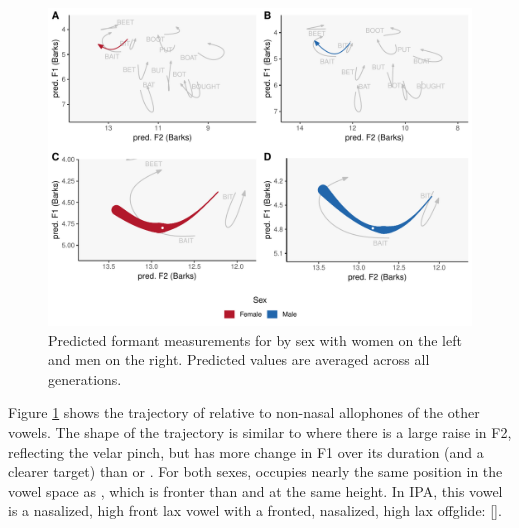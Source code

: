 \begin{figure}[tb!]
    \centering
    \includegraphics[width = 6.5in]{Figures/BING/BING_four_panel_plot_summarized.pdf}
    \caption[Predicted formant measurements for \bing by sex.]{Predicted formant measurements for \bing by sex with women on the left and men on the right. Predicted values are averaged across all generations.}
    \label{fig:BING_four_panel_plot_summarized}
\end{figure}

Figure \ref{fig:BING_four_panel_plot_summarized} shows the trajectory of \bing relative to non-nasal allophones of the other vowels. The shape of the trajectory is similar to \bang where there is a large raise in F2, reflecting the velar pinch, but \bing has more change in F1 over its duration (and a clearer target) than \bang or \beng. For both sexes, \bing occupies nearly the same position in the vowel space as \face, which is fronter than \bit and at the same height. In IPA, this vowel is a nasalized, high front lax vowel with a fronted, nasalized, high lax offglide:  [].

